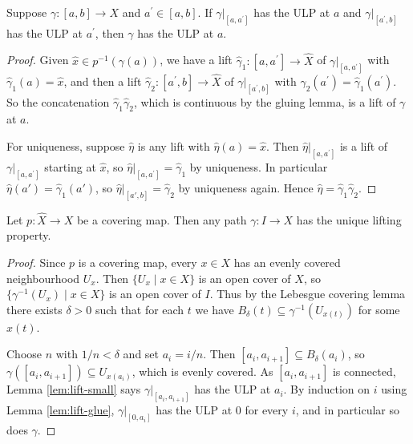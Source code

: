 \begin{lemma} \label{lem:lift-glue}
	Suppose $\gamma:[a, b] \rightarrow X$ and $a^{\prime} \in[a, b]$. If $\gamma|_{[a, a^{\prime}]}$ has the ULP at $a$ and $\gamma|_{[a^{\prime}, b]}$ has the ULP at $a^{\prime}$, then $\gamma$ has the ULP at $a$.
\end{lemma}
\begin{proof}
	Given $\hat x \in p^{-1}(\gamma(a))$, we have a lift $\hat{\gamma}_1:[a, a^{\prime}] \rightarrow \hat{X}$ of $\gamma|_{[a, a^{\prime}]}$ with $\hat\gamma_1(a) = \hat x$, and then a lift $\hat{\gamma}_2:[a^{\prime}, b] \rightarrow \hat{X}$ of $\gamma|_{[a^{\prime}, b]}$ with $\hat{\gamma}_2(a^{\prime})=\hat{\gamma}_1(a^{\prime})$. So the concatenation $\hat{\gamma}_1 \hat{\gamma}_2$, which is continuous by the gluing lemma, is a lift of $\gamma$ at $a$.

	For uniqueness, suppose $\hat{\eta}$ is any lift with $\hat\eta(a) = \hat x$. Then $\hat{\eta}|_{[a, a^{\prime}]}$ is a lift of $\gamma|_{[a, a^{\prime}]}$ starting at $\hat x$, so $\hat{\eta}|_{[a, a^{\prime}]}=\hat{\gamma}_1$ by uniqueness. In particular $\hat\eta(a') = \hat\gamma_1(a')$, so $\hat\eta|_{[a',b]} = \hat\gamma_2$ by uniqueness again. Hence $\hat\eta = \hat\gamma_1\hat\gamma_2$.
\end{proof}

\begin{theorem} \label{thm:path-lifting}
	Let $p: \hat X \to X$ be a covering map. Then any path $\gamma: I \rightarrow X$ has the unique lifting property.
\end{theorem}
\begin{proof}
	Since $p$ is a covering map, every $x \in X$ has an evenly covered neighbourhood $U_x$. Then $\{U_x \mid x \in X\}$ is an open cover of $X$, so $\{\gamma^{-1}(U_x) \mid x \in X\}$ is an open cover of $I$. Thus by the Lebesgue covering lemma there exists $\delta>0$ such that for each $t$ we have $B_\delta(t) \subseteq \gamma^{-1}(U_{x(t)})$ for some $x(t)$.

	Choose $n$ with $1/n<\delta$ and set $a_i=i/n$. Then $[a_i, a_{i+1}] \subseteq B_\delta(a_i)$, so $\gamma([a_i, a_{i+1}]) \subseteq U_{x(a_i)}$, which is evenly covered. As $[a_i,a_{i+1}]$ is connected, Lemma \ref{lem:lift-small} says $\gamma|_{[a_i, a_{i+1}]}$ has the ULP at $a_i$. By induction on $i$ using Lemma \ref{lem:lift-glue}, $\gamma|_{[0,a_i]}$ has the ULP at $0$ for every $i$, and in particular so does $\gamma$.
\end{proof}

